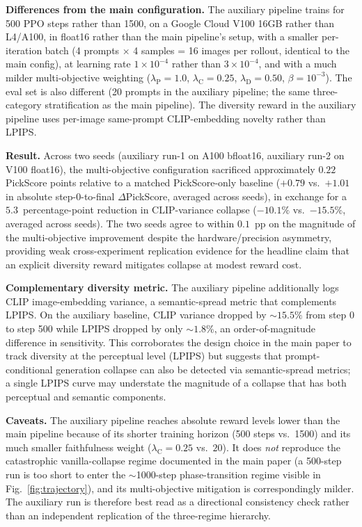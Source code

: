 \documentclass[10pt,letterpaper]{article}
\newcommand{\paragraphhead}[1]{\vspace{0.4ex}\noindent\textbf{#1}\hspace{0.5em}}
\newcommand{\lambdaP}{\lambda_{\mathrm{P}}}
\newcommand{\lambdaC}{\lambda_{\mathrm{C}}}
\newcommand{\lambdaD}{\lambda_{\mathrm{D}}}
\begin{document}
\paragraphhead{Differences from the main configuration.}
The auxiliary pipeline trains for 500 PPO steps rather than 1500, on a Google Cloud V100 16GB rather than L4/A100, in float16 rather than the main pipeline's setup, with a smaller per-iteration batch (4 prompts $\times$ 4 samples = 16 images per rollout, identical to the main config), at learning rate $1{\times}10^{-4}$ rather than $3{\times}10^{-4}$, and with a much milder multi-objective weighting ($\lambdaP = 1.0$, $\lambdaC = 0.25$, $\lambdaD = 0.50$, $\beta = 10^{-3}$). The eval set is also different (20 prompts in the auxiliary pipeline; the same three-category stratification as the main pipeline). The diversity reward in the auxiliary pipeline uses per-image same-prompt CLIP-embedding novelty rather than LPIPS.

\paragraphhead{Result.}
Across two seeds (auxiliary run-1 on A100 bfloat16, auxiliary run-2 on V100 float16), the multi-objective configuration sacrificed approximately $0.22$ PickScore points relative to a matched PickScore-only baseline ($+0.79$ vs.\ $+1.01$ in absolute step-0-to-final $\Delta$PickScore, averaged across seeds), in exchange for a $5.3$~percentage-point reduction in CLIP-variance collapse ($-10.1\%$ vs.\ $-15.5\%$, averaged across seeds). The two seeds agree to within $0.1$~pp on the magnitude of the multi-objective improvement despite the hardware/precision asymmetry, providing weak cross-experiment replication evidence for the headline claim that an explicit diversity reward mitigates collapse at modest reward cost.

\paragraphhead{Complementary diversity metric.}
The auxiliary pipeline additionally logs CLIP image-embedding variance, a semantic-spread metric that complements LPIPS. On the auxiliary baseline, CLIP variance dropped by ${\sim}15.5\%$ from step 0 to step 500 while LPIPS dropped by only ${\sim}1.8\%$, an order-of-magnitude difference in sensitivity. This corroborates the design choice in the main paper to track diversity at the perceptual level (LPIPS) but suggests that prompt-conditional generation collapse can also be detected via semantic-spread metrics; a single LPIPS curve may understate the magnitude of a collapse that has both perceptual and semantic components.

\paragraphhead{Caveats.}
The auxiliary pipeline reaches absolute reward levels lower than the main pipeline because of its shorter training horizon (500 steps vs.\ 1500) and its much smaller faithfulness weight ($\lambdaC = 0.25$ vs.\ $20$). It does \emph{not} reproduce the catastrophic vanilla-collapse regime documented in the main paper (a 500-step run is too short to enter the $\sim$1000-step phase-transition regime visible in Fig.~\ref{fig:trajectory}), and its multi-objective mitigation is correspondingly milder. The auxiliary run is therefore best read as a directional consistency check rather than an independent replication of the three-regime hierarchy.
\end{document}
